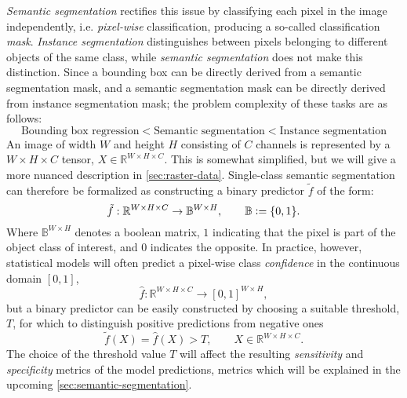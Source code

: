 \textit{Semantic segmentation} rectifies this issue by classifying each pixel in the image independently, i.e. \textit{pixel-wise} classification, producing a so-called classification \textit{mask}.
\textit{Instance segmentation} distinguishes between pixels belonging to different objects of the same class, while \textit{semantic segmentation} does not make this distinction.
Since a bounding box can be directly derived from a semantic segmentation mask, and a semantic segmentation mask can be directly derived from instance segmentation mask; the problem complexity of these tasks are as follows:
%
\begin{equation*}
  \text{Bounding box regression}
  <
  \text{Semantic segmentation}
  <
  \text{Instance segmentation}
\end{equation*}
%
An image of width $W$ and height $H$ consisting of $C$ channels is represented by a $W \times H \times C$ tensor, $X \in \mathbb{R}^{W \times H \times C}$.
This is somewhat simplified, but we will give a more nuanced description in \cref{sec:raster-data}.
Single-class semantic segmentation can therefore be formalized as constructing a binary predictor $\tilde{f}$ of the form:
%
\begin{equation*}
  \tilde{f}: \mathbb{R}^{W \times H \times C} \rightarrow \mathbb{B}^{W \times H}, \hspace{2em} \mathbb{B} \vcentcolon= \{0, 1\}.
\end{equation*}
%
Where $\mathbb{B}^{W \times H}$ denotes a boolean matrix, $1$ indicating that the pixel is part of the object class of interest, and $0$ indicates the opposite.
In practice, however, statistical models will often predict a pixel-wise class \textit{confidence} in the continuous domain $[0, 1]$,
%
\begin{equation*}
  \hat{f}: \mathbb{R}^{W \times H \times C} \rightarrow {[0, 1]}^{W \times H},
\end{equation*}
%
but a binary predictor can be easily constructed by choosing a suitable threshold, $T$, for which to distinguish positive predictions from negative ones
%
\begin{equation*}
  \tilde{f}(X) = \hat{f}(X) > T, \hspace{2em} X \in \mathbb{R}^{W \times H \times C}.
\end{equation*}
%
The choice of the threshold value $T$ will affect the resulting \textit{sensitivity} and \textit{specificity} metrics of the model predictions, metrics which will be explained in the upcoming \cref{sec:semantic-segmentation}.
